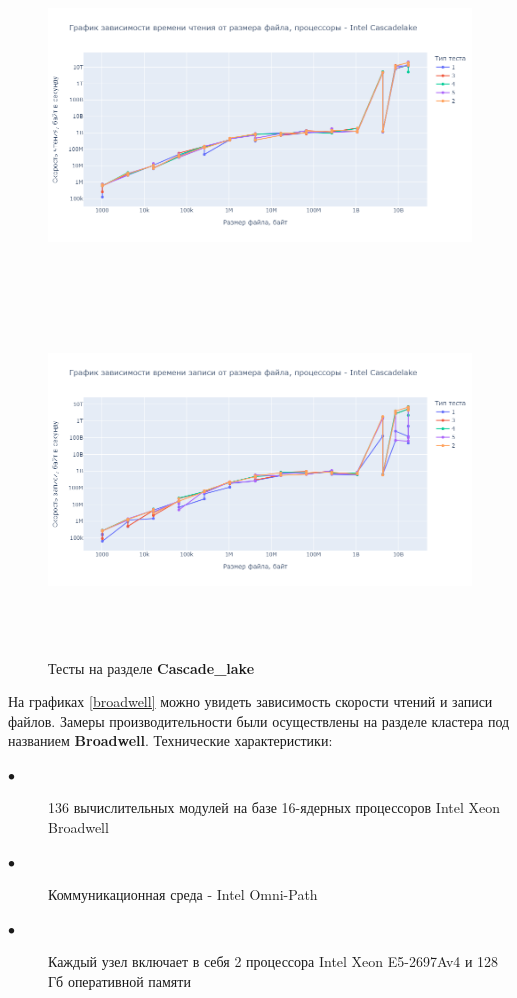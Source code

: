 \begin{figure}[h]
\includegraphics[height=9cm,keepaspectratio]{./test_graphs/read_cascadelake.png}\\[0.1cm]
\includegraphics[height=9cm,keepaspectratio]{./test_graphs/write_cascadelake.png}\\[0.1cm]
\caption{Тесты на разделе \textbf{Cascade\_lake}}
\label{cascadelake}
\end{figure}

На графиках \ref{broadwell} можно увидеть зависимость скорости чтений и записи файлов. Замеры производительности были осуществлены на разделе кластера под названием \textbf{Broadwell}. Технические характеристики:
\begin{description}
    \item[$\bullet$] 136 вычислительных модулей на базе 16-ядерных процессоров Intel Xeon Broadwell
    \item[$\bullet$] Коммуникационная среда - Intel Omni-Path
    \item[$\bullet$] Каждый узел включает в себя 2 процессора Intel Xeon E5-2697Av4 и 128 Гб оперативной памяти
\end{description}


